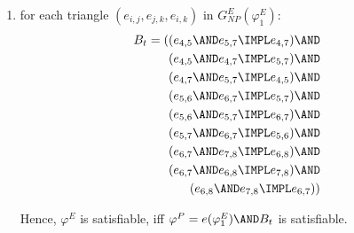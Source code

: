 {\begin{enumerate}
\begin{enumerate}
\item for each triangle $(e_{i,j},e_{j,k},e_{i,k})$ in $G_{NP}^{E}(\varphi
_{1}^{E})$:%
\begin{eqnarray*}
B_{t}=((e_{4,5}\AND e_{5,7}\IMPL e_{4,7})\AND && \\
(e_{4,5}\AND e_{4,7}\IMPL e_{5,7})\AND && \\
(e_{4,7}\AND e_{5,7}\IMPL e_{4,5})\AND && \\
(e_{5,6}\AND e_{6,7}\IMPL e_{5,7})\AND && \\
(e_{5,6}\AND e_{5,7}\IMPL e_{6,7})\AND && \\
(e_{5,7}\AND e_{6,7}\IMPL e_{5,6})\AND && \\
(e_{6,7}\AND e_{7,8}\IMPL e_{6,8})\AND && \\
(e_{6,7}\AND e_{6,8}\IMPL e_{7,8})\AND && \\
(e_{6,8}\AND e_{7,8}\IMPL e_{6,7})) &&
\end{eqnarray*}

Hence, $\varphi ^{E}$ is satisfiable, iff $\varphi ^{P}=e(\varphi _{1}^{E})%
\AND B_{t}$ is satisfiable.
\end{enumerate}
\end{enumerate}


  }